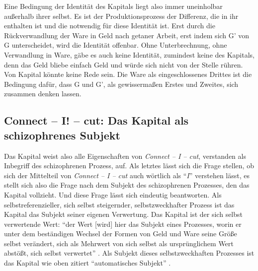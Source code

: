 \documentclass[12pt,
               paper=a4,
               twoside=false,
               onehalfspacing,
               bibliography=totoc,
               toc=graduated,
               ]{scrartcl}
\newcommand{\pc}[2]{\parencite[#1]{#2}}
\newcommand{\cic}{Connect -- I -- cut\xspace}
\begin{document}

Eine Bedingung der Identität des Kapitals liegt also immer uneinholbar
außerhalb ihrer selbst. Es ist der Produktionsprozess der Differenz,
die in ihr enthalten ist und die notwendig für diese Identität ist.
Erst durch die Rückverwandlung der Ware in Geld nach \glq getaner
Arbeit\grq, erst indem sich G' von G unterscheidet, wird die Identität
offenbar. Ohne Unterbrechnung, ohne Verwandlung in Ware, gäbe es auch
keine Identität, zumindest keine des Kapitals, denn das Geld bliebe
einfach Geld und würde sich nicht von der Stelle rühren. Von Kapital
könnte keine Rede sein. Die Ware als eingeschlossenes Drittes ist die
Bedingung dafür, dass G und G', als gewissermaßen Erstes und Zweites,
sich zusammen denken lassen.




\subsection{Connect -- I! -- cut: Das Kapital als schizophrenes Subjekt}

Das Kapital weist also alle Eigenschaften von \emph{\cic}, verstanden
als Inbegriff des schizophrenen Prozess, auf. Als letztes lässt sich
die Frage stellen, ob sich der Mittelteil von \emph{\cic} auch
wörtlich als "`\emph{I}"' verstehen lässt, es stellt sich also die
Frage nach dem Subjekt des schizophrenen Prozesses, den das Kapital
vollzieht. Und diese Frage lässt sich eindeutig beantworten. Als
selbstreferenzieller, sich selbst steigernder, selbstzweckhafter
Prozess ist das Kapital das Subjekt seiner eigenen Verwertung. Das
Kapital ist der sich selbst verwertende Wert: "`der Wert [wird] hier
das Subjekt eines Prozesses, worin er unter dem beständigen Wechsel
der Formen von Geld und Ware seine Größe selbst verändert, sich als
Mehrwert von sich selbst als ursprünglichem Wert abstößt, sich selbst
verwertet"' \pc{169}{kap}. Als Subjekt dieses selbstzweckhaften
Prozesses ist das Kapital wie oben zitiert "`automatisches Subjekt"'
\pc{169}{kap}.
\end{document}
